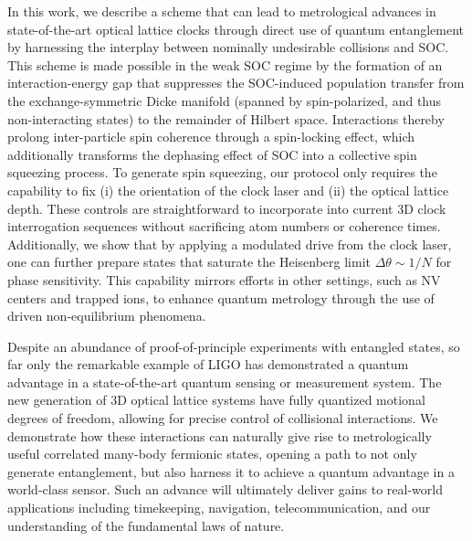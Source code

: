 \documentclass[aps,prx,superscriptaddress,notitlepage,twocolumn,longbibliography]{revtex4-2}
\begin{document}
In this work, we describe a scheme that can lead to metrological advances in state-of-the-art optical lattice clocks through direct use of quantum entanglement by harnessing the interplay between nominally undesirable collisions and SOC.
This scheme is made possible in the weak SOC regime by the formation of an interaction-energy gap that suppresses the SOC-induced population transfer from the exchange-symmetric Dicke manifold (spanned by spin-polarized, and thus non-interacting states) to the remainder of Hilbert space.
Interactions thereby prolong inter-particle spin coherence through a spin-locking effect, which additionally transforms the dephasing effect of SOC into a collective spin squeezing process.
To generate spin squeezing, our protocol only requires the capability to fix (i) the orientation of the clock laser and (ii) the optical lattice depth.
These controls are straightforward to incorporate into current 3D clock interrogation sequences without sacrificing atom numbers or coherence times.
Additionally, we show that by applying a modulated drive from the clock laser, one can further prepare states that saturate the Heisenberg limit $\Delta\theta\sim1/N$ for phase sensitivity\cite{kitagawa1993squeezed, ma2011quantum, degen2017quantum}.
This capability mirrors efforts in other settings, such as NV centers\cite{bauch2018ultralong, aiello2013compositepulse} and trapped ions\cite{burd2019quantum}, to enhance quantum metrology through the use of driven non-equilibrium phenomena.

Despite an abundance of proof-of-principle experiments with entangled states\cite{degen2017quantum, pezze2018quantum}, so far only the remarkable example of LIGO\cite{aasi2013enhanced, abbott2016gw150914} has demonstrated a quantum advantage in a state-of-the-art quantum sensing or measurement system.
The new generation of 3D optical lattice systems have fully quantized motional degrees of freedom\cite{campbell2017fermidegenerate}, allowing for precise control of collisional interactions.
We demonstrate how these interactions can naturally give rise to metrologically useful correlated many-body fermionic states, opening a path to not only generate entanglement, but also harness it to achieve a quantum advantage in a world-class sensor.
Such an advance will ultimately deliver gains to real-world applications including timekeeping, navigation, telecommunication, and our understanding of the fundamental laws of nature\cite{safronova2018search}.

\end{document}
